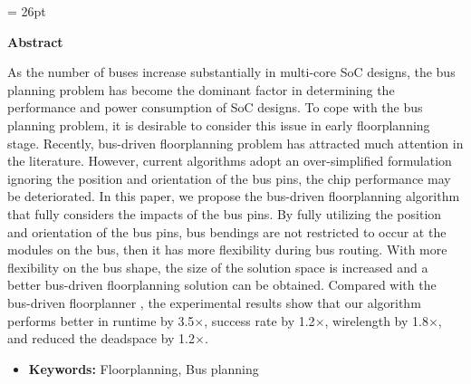 

\baselineskip = 26pt


\newpage
{}
{}


\begin{center}
\large \textbf{Abstract}
\end{center}


As the number of buses increase substantially in multi-core SoC
designs, the bus planning problem has become the dominant factor
in determining the performance and power consumption of SoC
designs. To cope with the bus planning problem, it is desirable to
consider this issue in early floorplanning stage. Recently,
bus-driven floorplanning problem has attracted much attention in
the literature. However, current algorithms adopt an
over-simplified formulation ignoring the position and
orientation of the bus pins, the chip performance may be deteriorated.
In this paper, we propose the bus-driven
floorplanning algorithm that fully considers the impacts of the bus
pins. By fully utilizing the position and orientation of the bus pins,
bus bendings are not restricted to occur at the modules on the bus,
then it has more flexibility during bus routing. With more
flexibility on the bus shape, the size of the solution
space is increased and a better bus-driven floorplanning solution
can be obtained. Compared with the bus-driven
floorplanner \cite{Ma08}, the experimental results show that our
algorithm performs better in runtime by 3.5$\times$, success rate
by 1.2$\times$, wirelength by 1.8$\times$, and reduced the
deadspace by 1.2$\times$.


\begin{itemize}
\item {\bf Keywords:} Floorplanning, Bus planning
\end{itemize}



